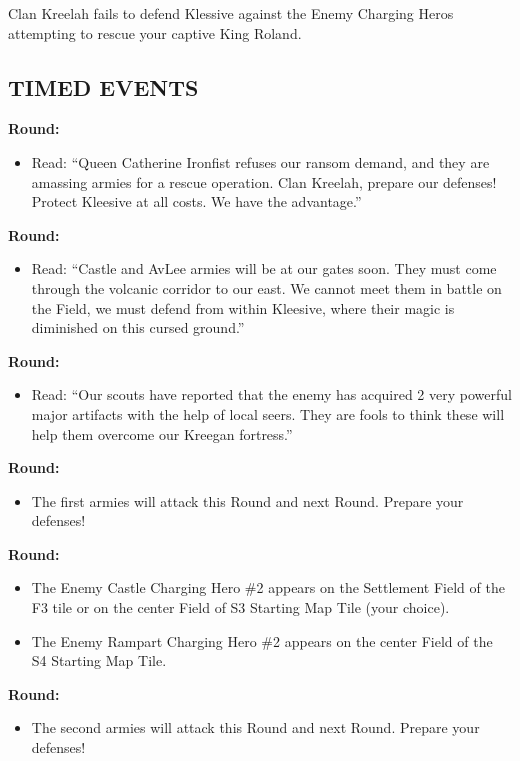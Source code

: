 \begin{multicols*}{2}
Clan Kreelah fails to defend Klessive against the Enemy Charging Heros attempting to rescue your captive King Roland.

\subsection*{\MakeUppercase{Timed Events}}

\textbf{ Round:}
\begin{itemize}
  \item Read: ``Queen Catherine Ironfist refuses our ransom demand, and they are amassing armies for a rescue
    operation. Clan Kreelah, prepare our defenses! Protect Kleesive at all costs. We have the advantage.''
\end{itemize}

\textbf{ Round:}
\begin{itemize}
  \item Read: ``Castle and AvLee armies will be at our gates soon. They must come through the volcanic corridor
    to our east. We cannot meet them in battle on the Field, we must defend from within Kleesive, where
    their magic is diminished on this cursed ground.''
\end{itemize}

\textbf{ Round:}
\begin{itemize}
  \item Read: ``Our scouts have reported that the enemy has acquired 2 very powerful major artifacts with the
    help of local seers. They are fools to think these will help them overcome our Kreegan fortress.”
\end{itemize}

\textbf{ Round:}
\begin{itemize}
  \item The first armies will attack this Round and next Round. Prepare your defenses!
\end{itemize}

\textbf{ Round:}
\begin{itemize}
  \item The Enemy Castle Charging Hero \#2 appears on the Settlement Field of the F3 tile or on the center Field of S3 Starting Map Tile (your choice).
  \item The Enemy Rampart Charging Hero \#2 appears on the center Field of the S4 Starting Map Tile.
\end{itemize}

\textbf{ Round:}
\begin{itemize}
  \item The second armies will attack this Round and next Round. Prepare your defenses!
\end{itemize}



\end{multicols*}
